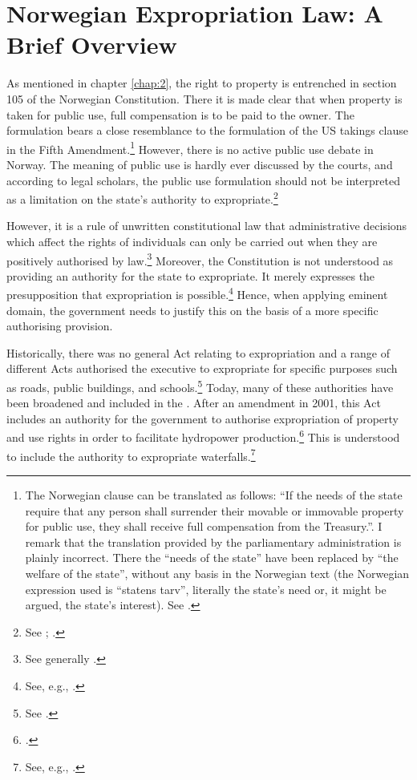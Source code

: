 \section{Norwegian Expropriation Law: A Brief Overview}\label{sec:5:2}

As mentioned in chapter \ref{chap:2}, the right to property is entrenched in section 105 of the Norwegian Constitution. There it is made clear that when property is taken for public use, full compensation is to be paid to the owner. The formulation bears a close resemblance to the formulation of the US takings clause in the Fifth Amendment.\footnote{The Norwegian clause can be translated as follows: ``If the needs of the state require that any person shall surrender their movable or immovable property for public use, they shall receive full compensation from the Treasury.''. I remark that the translation provided by the parliamentary administration is plainly  incorrect. There the ``needs of the state'' have been replaced by ``the welfare of the state'', without any basis in the Norwegian text (the Norwegian expression used is ``statens tarv'', literally the state's need or, it might be argued, the state's interest). See \cite{grunnlovsjuks}.} However, there is no active public use debate in Norway. The meaning of public use is hardly ever discussed by the courts, and according to legal scholars, the public use formulation should not be interpreted as a limitation on the state's authority to expropriate.\footnote{See \cite[249]{aall04}; \cite{sauda09}.}

However, it is a rule of unwritten constitutional law that administrative decisions which affect the rights of individuals can only be carried out when they are positively authorised by law.\footnote{See generally \cite{hogberg11}.} Moreover, the Constitution is not understood as providing an authority for the state to expropriate. It merely expresses the presupposition that expropriation is possible.\footnote{See, e.g., \cite[6]{fleischer86}.} Hence, when applying eminent domain, the government needs to justify this on the basis of a more specific authorising provision. 

Historically, there was no general Act relating to expropriation and a range of different Acts authorised the executive to expropriate for specific purposes such as roads, public buildings, and schools.\footnote{See \cite[11-12]{nut54}.} Today, many of these authorities have been broadened and included in the \cite{ea59}. After an amendment in 2001, this Act includes an authority for the government to authorise expropriation of property and use rights in order to facilitate hydropower production.\dni\footcite[2 no 51]{ea59} This is understood to include the authority to expropriate waterfalls.\footnote{See, e.g., 
\cite{sauda07}.}

